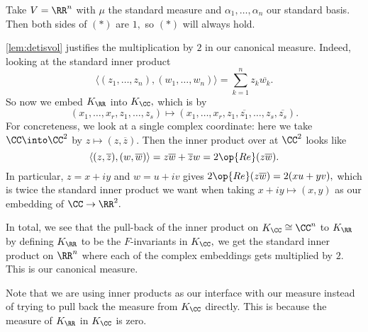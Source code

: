 \documentclass[../notes.tex]{subfiles}
\begin{document}
\begin{example}
    Take $V=\RR^n$ with $\mu$ the standard measure and $\alpha_1,\ldots,\alpha_n$ our standard basis. Then both sides of $(*)$ are $1,$ so $(*)$ will always hold.
\end{example}
\autoref{lem:detisvol} justifies the multiplication by $2$ in our canonical measure. Indeed, looking at the standard inner product
\[\langle (z_1,\ldots,z_n),(w_1,\ldots,w_n)\rangle=\sum_{k=1}^nz_k\overline{w_k}.\]
So now we embed $K_\RR$ into $K_\CC,$ which is by
\[(x_1,\ldots,x_r,z_1,\ldots,z_s)\longmapsto(x_1,\ldots,x_r,z_1,\overline{z_1},\ldots,z_s,\overline{z_s}).\]
For concreteness, we look at a single complex coordinate: here we take $\CC\into\CC^2$ by $z\mapsto(z,\overline z).$ Then the inner product over at $\CC^2$ looks like
\[\langle(z,\overline z),(w,\overline w)\rangle=z\overline w+\overline zw=2\op{Re}(z\overline w).\]
In particular, $z=x+iy$ and $w=u+iv$ gives $2\op{Re}(z\overline w)=2(xu+yv),$ which is twice the standard inner product we want when taking $x+iy\mapsto(x,y)$ as our embedding of $\CC\to\RR^2.$

In total, we see that the pull-back of the inner product on $K_\CC\cong\CC^n$ to $K_\RR$ by defining $K_\RR$ to be the $F$-invariants in $K_\CC,$ we get the standard inner product on $\RR^n$ where each of the complex embeddings gets multiplied by $2.$ This is our canonical measure.
\begin{remark}
    Note that we are using inner products as our interface with our measure instead of trying to pull back the measure from $K_\CC$ directly. This is because the measure of $K_\RR$ in $K_\CC$ is zero.
\end{remark}
\end{document}
